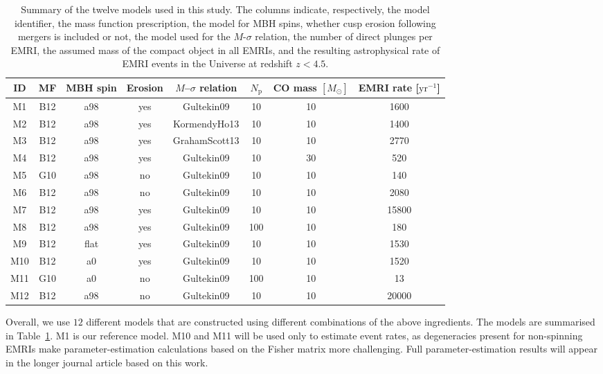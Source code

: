 \documentclass[a4paper]{jpconf}
\begin{document}
\begin{table}
\begin{center}
\begin{tabular}{cccccccc}%
ID&MF&MBH spin&Erosion&$M$--$\sigma$ relation&$N_\mathrm{p}$&CO mass $[M_\odot]$&EMRI rate [$\mathrm{yr}^{-1}$]\\\hline
M1&B12&a98&yes&Gultekin09&10&10&1600\\
M2&B12&a98&yes&KormendyHo13&10&10&1400\\
M3&B12&a98&yes&GrahamScott13&10&10&2770\\
M4&B12&a98&yes&Gultekin09&10&30&520\\
M5&G10&a98&no&Gultekin09&10&10&140\\
M6&B12&a98&no&Gultekin09&10&10&2080\\
M7&B12&a98&yes&Gultekin09&10&10&15800\\
M8&B12&a98&yes&Gultekin09&100&10&180\\
M9&B12&flat&yes&Gultekin09&10&10&1530\\
M10&B12&a0&yes&Gultekin09&10&10&1520\\
M11&G10&a0&no&Gultekin09&100&10&13\\
M12&B12&a98&no&Gultekin09&10&10&20000\\
\end{tabular}
\end{center}
\caption{\label{tab:modelsumm}Summary of the twelve models used in this study. The columns indicate, respectively, the model identifier, the mass function prescription, the model for MBH spins, whether cusp erosion following mergers is included or not, the model used for the $M$-$\sigma$ relation, the number of direct plunges per EMRI, the assumed mass of the compact object in all EMRIs, and the resulting astrophysical rate of EMRI events in the Universe at redshift $z < 4.5$.}
\end{table}

Overall, we use $12$ different models that are constructed using different combinations of the above ingredients. The models are summarised in Table~\ref{tab:modelsumm}. M1 is our reference model. M10 and M11 will be used only to estimate event rates, as degeneracies present for non-spinning EMRIs make parameter-estimation calculations based on the Fisher matrix more challenging. Full parameter-estimation results will appear in the longer journal article based on this work.
\end{document}

